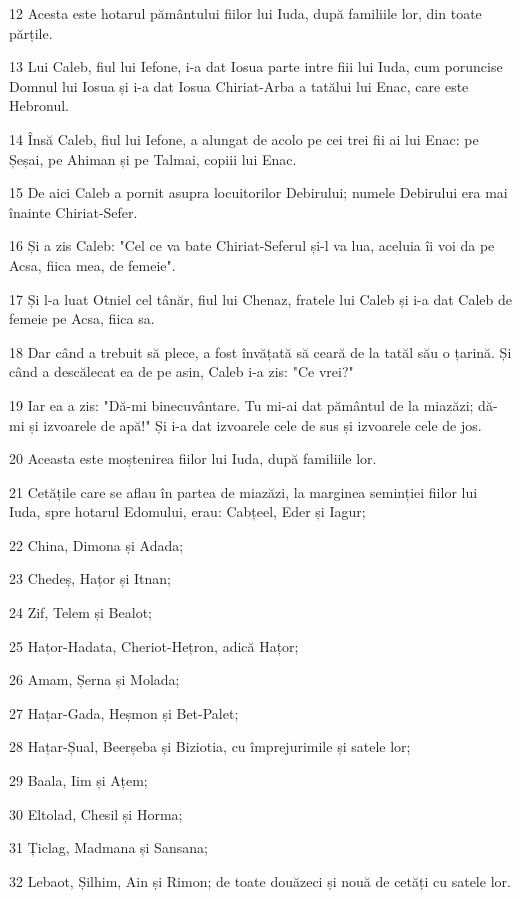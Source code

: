 \par 12 Acesta este hotarul pământului fiilor lui Iuda, după familiile lor, din toate părțile.
\par 13 Lui Caleb, fiul lui Iefone, i-a dat Iosua parte intre fiii lui Iuda, cum poruncise Domnul lui Iosua și i-a dat Iosua Chiriat-Arba a tatălui lui Enac, care este Hebronul.
\par 14 Însă Caleb, fiul lui Iefone, a alungat de acolo pe cei trei fii ai lui Enac: pe Șeșai, pe Ahiman și pe Talmai, copiii lui Enac.
\par 15 De aici Caleb a pornit asupra locuitorilor Debirului; numele Debirului era mai înainte Chiriat-Sefer.
\par 16 Și a zis Caleb: "Cel ce va bate Chiriat-Seferul și-l va lua, aceluia îi voi da pe Acsa, fiica mea, de femeie".
\par 17 Și l-a luat Otniel cel tânăr, fiul lui Chenaz, fratele lui Caleb și i-a dat Caleb de femeie pe Acsa, fiica sa.
\par 18 Dar când a trebuit să plece, a fost învățată să ceară de la tatăl său o țarină. Și când a descălecat ea de pe asin, Caleb i-a zis: "Ce vrei?"
\par 19 Iar ea a zis: "Dă-mi binecuvântare. Tu mi-ai dat pământul de la miazăzi; dă-mi și izvoarele de apă!" Și i-a dat izvoarele cele de sus și izvoarele cele de jos.
\par 20 Aceasta este moștenirea fiilor lui Iuda, după familiile lor.
\par 21 Cetățile care se aflau în partea de miazăzi, la marginea seminției fiilor lui Iuda, spre hotarul Edomului, erau: Cabțeel, Eder și Iagur;
\par 22 China, Dimona și Adada;
\par 23 Chedeș, Hațor și Itnan;
\par 24 Zif, Telem și Bealot;
\par 25 Hațor-Hadata, Cheriot-Hețron, adică Hațor;
\par 26 Amam, Șerna și Molada;
\par 27 Hațar-Gada, Heșmon și Bet-Palet;
\par 28 Hațar-Șual, Beerșeba și Biziotia, cu împrejurimile și satele lor;
\par 29 Baala, Iim și Ațem;
\par 30 Eltolad, Chesil și Horma;
\par 31 Țiclag, Madmana și Sansana;
\par 32 Lebaot, Șilhim, Ain și Rimon; de toate douăzeci și nouă de cetăți cu satele lor.
